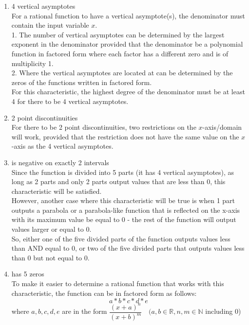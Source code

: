 \documentclass[12pt]{book}
\begin{document}
\begin{enumerate}
\begin{enumerate}
\item 4 vertical asymptotes\\

For a rational function to have a vertical asymptote(s), the denominator must contain the input variable $x$.\\
1. The number of vertical asymptotes can be determined by the largest exponent in the denominator provided that the denominator be a polynomial function in factored form where each factor has a different zero and is of multiplicity 1.\\
2. Where the vertical asymptotes are located at can be determined by the zeros of the functions written in factored form.\\

For this characteristic, the highest degree of the denominator must be at least 4 for there to be 4 vertical asymptotes.

\item 2 point discontinuities\\

For there to be 2 point discontinuities, two restrictions on the $x$-axis/domain will work, provided that the restriction does not have the same value on the $x$-axis as the 4 vertical asymptotes.

\item is negative on exactly 2 intervals\\

Since the function is divided into 5 parts (it has 4 vertical asymptotes), as long as 2 parts and only 2 parts output values that are less than 0, this characteristic will be satisfied.\\

However, another case where this characteristic will be true is when 1 part outputs a parabola or a parabola-like function that is reflected on the x-axis with its maximum value be equal to 0 - the rest of the function will output values larger or equal to 0.\\

So, either one of the five divided parts of the function outputs values less than AND equal to 0, or two of the five divided parts that outputs values less than 0 but not equal to 0.

\item has 5 zeros\\

To make it easier to determine a rational function that works with this characteristic, the function can be in factored form as follows:
$$a * b * c * d * e$$
where $a, b, c, d, e$ are in the form $\dfrac{(x+a)^n}{(x+b)^m} \quad (a,b \in \mathbb{R}, n,m \in \mathbb{N}$ including 0)


\end{enumerate}
\end{enumerate}
\end{document}
